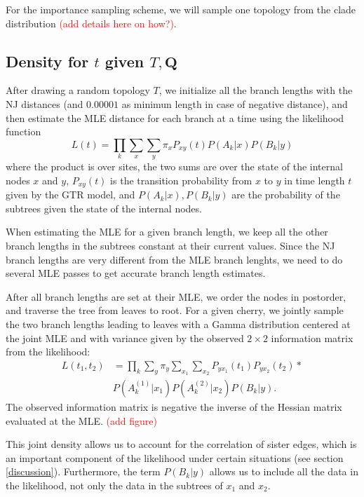 \documentclass[useAMS,usenatbib]{biom}
\newcommand{\falta}[1]{\textcolor{red}{#1}}
\begin{document}
For the importance sampling scheme, we will sample one topology from
the clade distribution \falta{(add details here on how?)}.


\subsection{Density for $t$ given $T,\mathbf{Q}$}
After drawing a random topology $T$, we initialize all the branch
lengths with the NJ distances (and $0.00001$ as minimun length in case
of negative distance), and then estimate the MLE distance for each
branch at a time using the likelihood function
\begin{equation}
L(t) = \prod_k \sum_x \sum_y \pi_x P_{xy}(t)P(A_k|x)P(B_k|y)
\end{equation}
where the product is over sites, the two sums are over the state of the
internal nodes $x$ and $y$, $P_{xy}(t)$ is the transition probability
from $x$ to $y$ in time length $t$ given by the GTR model, and
$P(A_k|x), P(B_k|y)$ are the probability of the subtrees given the
state of the internal nodes.

When estimating the MLE for a given branch length, we keep all the
other branch lengths in the subtrees constant at their current
values. Since the NJ branch lengths are very different from the MLE
branch lenghts, we need to do several MLE passes to get accurate
branch length estimates.

After all branch lengths are set at their MLE, we order the nodes in
postorder, and traverse the tree from leaves to root. For a given
cherry, we jointly sample the two branch lengths leading to leaves
with a Gamma distribution centered at the joint MLE and with variance
given by the observed $2 \times 2$ information matrix from the
likelihood:
\begin{eqnarray*}
L(t_1,t_2) &= \prod_k \sum_y \pi_y \sum_{x_1} \sum_{x_2}
P_{yx_1}(t_1)P_{yx_2}(t_2) * \\
&P(A^{(1)}_k|x_1)P(A^{(2)}_k|x_2)P(B_k|y).
\end{eqnarray*}
The observed information matrix is negative the inverse of the Hessian
matrix evaluated at the MLE.
\falta{(add figure)}

This joint density allows us to account for the correlation of
sister edges, which is an important component of the likelihood under
certain situations (see section \ref{discussion}). Furthermore, the
term $P(B_k|y)$ allows us to include all the data in the likelihood,
not only the data in the subtrees of $x_1$ and $x_2$.
\end{document}
